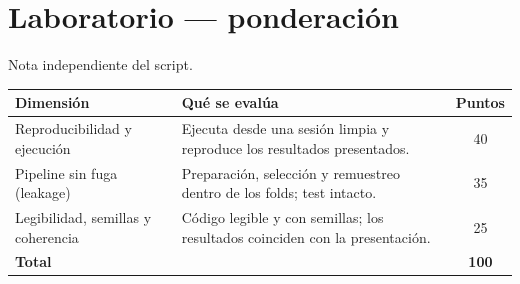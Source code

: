 \documentclass[11pt,letterpaper]{article}
\begin{document}
\section*{Laboratorio --- ponderación}
Nota independiente del script.
\begin{center}\small
\begin{tabular}{p{4.9cm} p{8.2cm} c}
\toprule
Dimensión & Qué se evalúa & Puntos \\
\midrule
Reproducibilidad y ejecución & Ejecuta desde una sesión limpia y reproduce los resultados presentados. & 40 \\
Pipeline sin fuga (leakage) & Preparación, selección y remuestreo dentro de los folds; test intacto. & 35 \\
Legibilidad, semillas y coherencia & Código legible y con semillas; los resultados coinciden con la presentación. & 25 \\
\midrule
\textbf{Total} & & \textbf{100} \\
\bottomrule
\end{tabular}\end{center}
\end{document}

